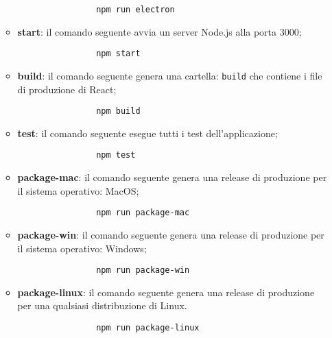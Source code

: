 \begin{itemize}
\begin{itemize}
            \begin{verbatim}
            	npm run electron
            \end{verbatim}
            \item \textbf{start}: il comando seguente avvia un server Node.js alla porta 3000;
            \begin{verbatim}
	            npm start
            \end{verbatim}
            \item \textbf{build}: il comando seguente genera una cartella: \verb|build| che contiene i file di produzione di React;
            \begin{verbatim}
            	npm build
            \end{verbatim}
            \item \textbf{test}: il comando seguente esegue tutti i test dell'applicazione;\\
            \begin{verbatim}
            	npm test
            \end{verbatim}
            \item \textbf{package-mac}: il comando seguente genera una release di produzione per il sistema operativo: MacOS;
            \begin{verbatim}
            	npm run package-mac
            \end{verbatim}
            \item \textbf{package-win}: il comando seguente genera una release di produzione per il sistema operativo: Windows;
            \begin{verbatim}
            	npm run package-win
            \end{verbatim}
            \item \textbf{package-linux}: il comando seguente genera una release di produzione per una qualsiasi distribuzione di Linux.
            \begin{verbatim}
            	npm run package-linux
            \end{verbatim}
        \end{itemize}
\end{itemize}
